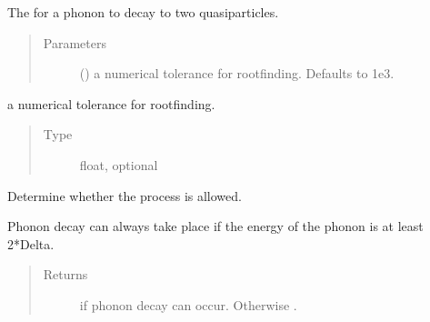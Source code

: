\documentclass[letterpaper,10pt,english]{sphinxmanual}
\begin{document}
\begin{fulllineitems}
\label{\detokenize{code_structure:scdc.interaction.PhononDecayToQuasiparticles}}
The  for a phonon to decay to two quasiparticles.
\begin{quote}\begin{description}
\item[{Parameters}] \leavevmode
{} (\sphinxstyleliteralemphasis{\sphinxupquote{, }}) \textendash{} a numerical tolerance for root\sphinxhyphen{}finding.
Defaults to 1e\sphinxhyphen{}3.

\end{description}\end{quote}

\begin{fulllineitems}
\label{\detokenize{code_structure:scdc.interaction.PhononDecayToQuasiparticles.tolerance}}
a numerical tolerance for root\sphinxhyphen{}finding.
\begin{quote}\begin{description}
\item[{Type}] \leavevmode
float, optional

\end{description}\end{quote}

\end{fulllineitems}


\begin{fulllineitems}
\label{\detokenize{code_structure:scdc.interaction.PhononDecayToQuasiparticles.allowed}}
Determine whether the process is allowed.

Phonon decay can always take place if the energy of the phonon is at
least 2*Delta.
\begin{quote}\begin{description}
\item[{Returns}] \leavevmode
{} if phonon decay can occur. Otherwise .


\end{description}
\end{quote}
\end{fulllineitems}
\end{fulllineitems}
\end{document}
